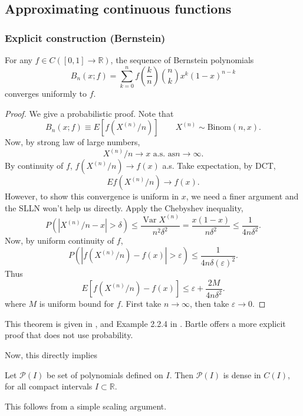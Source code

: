 
\subsection{Approximating continuous functions}

\subsubsection{Explicit construction (Bernstein)}

\begin{theorem}
	For any $f \in C([0,1] \to \mathbb{R})$, the sequence of Bernstein polynomials
	\[
		B_n(x;f) = \sum_{k=0}^{n} f\left( \frac{k}{n} \right) \binom{n}{k} x^k (1-x)^{n - k}
	\] 
	converges uniformly to $f$.
\end{theorem}
\begin{proof}
	We give a probabilistic proof. Note that
	\[
		B_n(x; f) \equiv E\left[ f\left( X^{(n)} / n \right)  \right] \qquad X^{(n)} \sim \text{Binom}(n, x) 
	.\] 
	Now, by strong law of large numbers,
	\[
		X^{(n)} / n \to x \text{ a.s. as} n\to \infty  
	.\] 
	By continuity of $f$, $f(X^{(n)} / n) \to f(x)$ a.s. Take expectation, by DCT,
	\[
		Ef(X^{(n)} / n) \to f(x)
	.\] 
	However, to show this convergence is uniform in $x$, we need a finer argument and the SLLN won't help us directly. Apply the Chebyshev inequality,
	\[
		P\left( \left| X^{(n)} / n - x \right| > \delta \right) \le \frac{\operatorname{Var} X^{(n)}}{n^2 \delta^2} = \frac{x(1-x)}{n \delta^2} \le \frac{1}{4 n \delta^2}
	.\] 
	Now, by uniform continuity of $f$, 
	\[
		P\left( \left| f\left( X^{(n)}/n \right)  - f(x) \right|  > \varepsilon \right) \le \frac{1}{4 n \delta(\varepsilon)^2}
	.\] 
	Thus
	\[
		E\left[ f\left( X^{(n)} / n\right) - f(x) \right] 
		\le  \varepsilon + \frac{2 M}{4 n \delta^2}
	.\] 
	where $M$ is uniform bound for $f$. First take $n \to \infty $, then take $\varepsilon \to 0$.
\end{proof}
This theorem is given in \cite{bartle1964elements}, and Example 2.2.4 in \cite{durrettProbabilityTheory}. Bartle offers a more explicit proof that does not use probability.

Now, this directly implies
\begin{corollary}
	Let $\mathcal{P}(I)$ be set of polynomials defined on $I$. Then
	$\mathcal{P}(I)$ is dense in $C(I)$, for all compact intervals $I \subset \mathbb{R}$.
\end{corollary}
This follows from a simple scaling argument.

